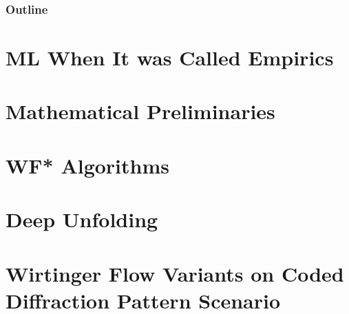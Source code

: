 \documentclass{beamer}
\theoremstyle{definition}
\theoremstyle{remark}
\begin{document}


\begin{frame}
\frametitle{Outline}
\tableofcontents[pausesections]
\end{frame}



\section[ML When It was Called Empirics]{ML When It was Called Empirics}


\section[Mathematical Preliminaries]{Mathematical Preliminaries}

\section[WF* Algorithms]{WF* Algorithms}


\section[Deep Unfolding]{Deep Unfolding}







\section[WF* Using CDPs]{Wirtinger Flow Variants on Coded Diffraction Pattern Scenario}
\end{document}
